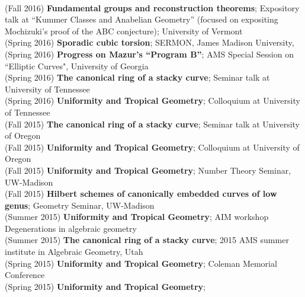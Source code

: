 \documentclass[margin,line]{res}
\begin{document}
\begin{resume}
\vspace{.05cm}\\
(Fall 2016) \textbf{Fundamental groups and reconstruction theorems}; Expository talk at ``Kummer Classes and Anabelian Geometry'' (focused on expositing Mochizuki's proof of the ABC conjecture); University of Vermont  
\vspace{.05cm}\\
(Spring 2016) \textbf{Sporadic cubic torsion};  
SERMON, James Madison University, 
\vspace{.05cm}\\
(Spring 2016) \textbf{Progress on Mazur's ``Program B''};  
AMS Special Session on  ``Elliptic Curves", University of Georgia
\vspace{.05cm}\\
(Spring 2016) \textbf{The canonical ring of a stacky curve};  
Seminar talk at University of Tennessee
\vspace{.05cm}\\
(Spring 2016) \textbf{Uniformity and Tropical Geometry};
Colloquium at University of Tennessee
\vspace{.05cm}\\
(Fall 2015) \textbf{The canonical ring of a stacky curve};  
Seminar talk at University of Oregon
\vspace{.05cm}\\
(Fall 2015) \textbf{Uniformity and Tropical Geometry};
Colloquium at University of Oregon
\vspace{.05cm}\\
(Fall 2015) \textbf{Uniformity and Tropical Geometry};
Number Theory Seminar, UW-Madison
\vspace{.05cm}\\
(Fall 2015) \textbf{Hilbert schemes of canonically embedded curves of low genus};
Geometry Seminar, UW-Madison
\vspace{.05cm}\\
(Summer 2015) \textbf{Uniformity and Tropical Geometry};
AIM workshop Degenerations in algebraic geometry
\vspace{.05cm}\\
(Summer 2015) \textbf{The canonical ring of a stacky curve};  
2015 AMS summer institute in Algebraic Geometry, Utah
\vspace{.05cm}\\
(Spring 2015) \textbf{Uniformity and Tropical Geometry};
Coleman Memorial Conference
\vspace{.05cm}\\
(Spring 2015) \textbf{Uniformity and Tropical Geometry};

\end{resume}
\end{document}
